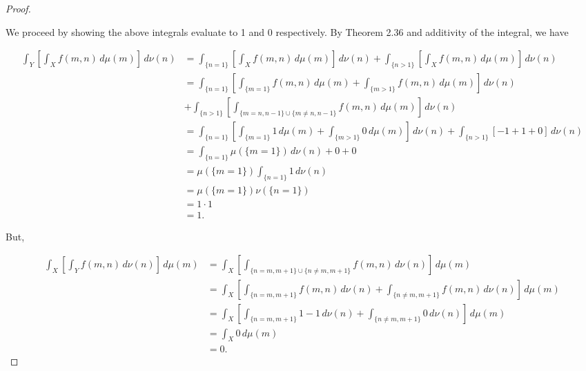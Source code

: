 \documentclass[11pt,oneside,english]{amsart}
\theoremstyle{definition}
\begin{document}
\begin{enumerate}
\begin{proof}
\begin{multicols}{2}

\end{multicols}

We proceed by showing the above integrals evaluate to 1 and 0 respectively. By Theorem 2.36 and additivity of the integral, we have






\begin{align*}
\int_Y\left[\int_X f(m,n)\,d\mu(m)\right]\,d\nu(n)&=\int_{\{n=1\}}\left[\int_X f(m,n)\,d\mu(m)\right]\,d\nu(n)+\int_{\{n>1\}}\left[\int_X f(m,n)\,d\mu(m)\right]\,d\nu(n)\\[2mm]
&=\int_{\{n=1\}}\left[\int_{\{m=1\}} f(m,n)\,d\mu(m)+\int_{\{m>1\}} f(m,n)\,d\mu(m)\right]\,d\nu(n)\\[2mm]
&+\int_{\{n>1\}}\left[\int_{\{m=n,n-1\}\cup\{m\neq n,n-1\}} f(m,n)\,d\mu(m)\right]\,d\nu(n)\\[2mm] 
&=\int_{\{n=1\}}\left[\int_{\{m=1\}}1\,d\mu(m)+\int_{\{m>1\}} 0\,d\mu(m)\right]\,d\nu(n)+\int_{\{n>1\}}[-1+1+0]\,d\nu(n)\\[2mm]
&=\int_{\{n=1\}}\mu(\{m=1\})\,d\nu(n)+0+0\\[2mm]
&=\mu(\{m=1\})\int_{\{n=1\}}1\,d\nu(n)\\[2mm]
&=\mu(\{m=1\})\nu(\{n=1\})\\[2mm]
&=1\cdot 1\\[2mm]
&=1.
\end{align*}

But,

\begin{align*}
\int_X\left[\int_Y f(m,n)\,d\nu(n)\right]\,d\mu(m)&=\int_X\left[\int_{\{n=m,m+1\}\cup\{n\neq m,m+1\}}f(m,n)\,d\nu(n)\right]\,d\mu(m)\\[2mm]
&=\int_X\left[\int_{\{n=m,m+1\}}f(m,n)\,d\nu(n)+\int_{\{n\neq m,m+1\}}f(m,n)\,d\nu(n)\right]\,d\mu(m)\\[2mm]
&=\int_X\left[\int_{\{n=m,m+1\}}1-1\,d\nu(n)+\int_{\{n\neq m,m+1\}}0\,d\nu(n)\right]\,d\mu(m)\\[2mm]
&=\int_X0\,d\mu(m)\\[2mm]
&=0.
\end{align*}


\end{proof}
\end{enumerate}
\end{document}
